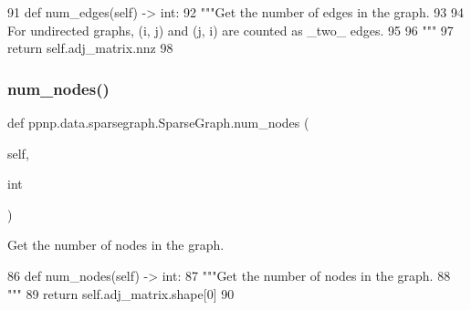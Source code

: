\begin{DoxyCode}
91     \textcolor{keyword}{def }num\_edges(self) -> int:
92         \textcolor{stringliteral}{"""Get the number of edges in the graph.}
93 \textcolor{stringliteral}{}
94 \textcolor{stringliteral}{        For undirected graphs, (i, j) and (j, i) are counted as \_two\_ edges.}
95 \textcolor{stringliteral}{}
96 \textcolor{stringliteral}{        """}
97         \textcolor{keywordflow}{return} self.adj\_matrix.nnz
98 
\end{DoxyCode}
\mbox{\label{classppnp_1_1data_1_1sparsegraph_1_1SparseGraph_a31dbd0918ae22ff10fe25a67b50d48db}} 
\subsubsection{\texorpdfstring{num\+\_\+nodes()}{num\_nodes()}}
{\footnotesize\ttfamily def ppnp.\+data.\+sparsegraph.\+Sparse\+Graph.\+num\+\_\+nodes (\begin{DoxyParamCaption}\item[{}]{self,  }\item[{}]{int }\end{DoxyParamCaption})}

\begin{DoxyVerb}Get the number of nodes in the graph.
\end{DoxyVerb}
 
\begin{DoxyCode}
86     \textcolor{keyword}{def }num\_nodes(self) -> int:
87         \textcolor{stringliteral}{"""Get the number of nodes in the graph.}
88 \textcolor{stringliteral}{        """}
89         \textcolor{keywordflow}{return} self.adj\_matrix.shape[0]
90 
\end{DoxyCode}
\mbox{\label{classppnp_1_1data_1_1sparsegraph_1_1SparseGraph_afe63f5f08dd3f75cf73cdbd632439205}} 

